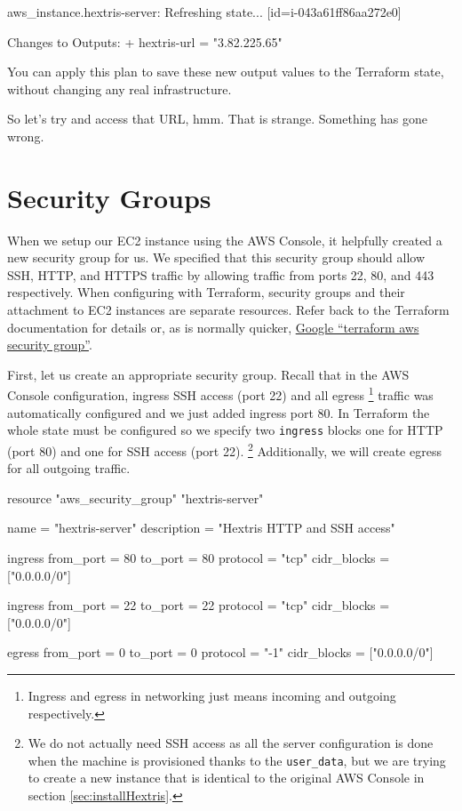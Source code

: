 \documentclass{csse4400}
\begin{document}
\begin{code}[numbers=none]{}
aws_instance.hextris-server: Refreshing state... [id=i-043a61ff86aa272e0]

Changes to Outputs:
  + hextris-url = "3.82.225.65"
\end{code}

You can apply this plan to save these new output values to the Terraform state, without changing any real infrastructure.  

So let's try and access that URL, hmm.
That is strange. Something has gone wrong.

\section{Security Groups}
When we setup our EC2 instance using the AWS Console,
it helpfully created a new security group for us.
We specified that this security group should allow SSH, HTTP, and HTTPS traffic by allowing traffic from ports 22, 80, and 443 respectively.
When configuring with Terraform, security groups and their attachment to EC2 instances are separate resources.
Refer back to the Terraform documentation for details or,
as is normally quicker, \href{https://www.google.com/search?q=terraform+aws+security+group}{Google ``terraform aws security group''}.

First, let us create an appropriate security group.
Recall that in the AWS Console configuration,
ingress SSH access (port 22) and all egress%
\footnote{Ingress and egress in networking just means incoming and outgoing respectively.}
traffic was automatically configured and we just added ingress port 80.
In Terraform the whole state must be configured so we specify two
\texttt{ingress} blocks one for HTTP (port 80) and one for SSH access (port 22).%
\footnote{We do not actually need SSH access as all the server configuration is done when the machine is provisioned thanks to the \texttt{user\_data},
but we are trying to create a new instance that is identical to the original AWS Console in section \ref{sec:installHextris}.}
Additionally, we will create egress for all outgoing traffic.

\begin{code}[language=terraform,numbers=none]{}
resource "aws_security_group" "hextris-server" {
  name = "hextris-server"
  description = "Hextris HTTP and SSH access"

  ingress {
    from_port = 80
    to_port = 80
    protocol = "tcp"
    cidr_blocks = ["0.0.0.0/0"]
  }

  ingress {
    from_port = 22
    to_port = 22
    protocol = "tcp"
    cidr_blocks = ["0.0.0.0/0"]
  }

  egress {
    from_port = 0
    to_port = 0
    protocol = "-1"
    cidr_blocks = ["0.0.0.0/0"]
  }
}
\end{code}
\end{document}
